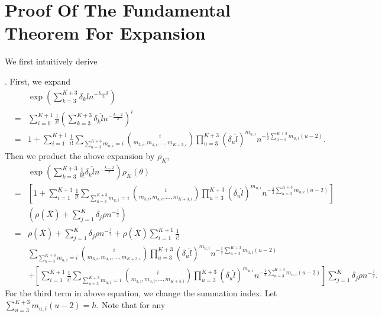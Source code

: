 \section{Proof Of The Fundamental Theorem For Expansion}\label{app-proof-fun-thm}

We first intuitively derive %
\begin{comment}
add expansion polynomial
\end{comment}
. First, we expand 
\begin{eqnarray*}
 &  & \exp\left(\sum_{k=3}^{K+3}\delta_{k}\hat{l}n^{-\frac{k-2}{2}}\right)\\
 & = & \sum_{i=0}^{K+1}\frac{1}{i!}\left(\sum_{k=3}^{K+3}\delta_{k}\hat{l}n^{-\frac{k-2}{2}}\right)^{i}\\
 & = & 1+\sum_{i=1}^{K+1}\frac{1}{i!}\sum_{\sum_{u=3}^{K+3}m_{u,i}=i}\binom{i}{m_{3,i},m_{4,i},\ldots,m_{K+3,i}}\prod_{u=3}^{K+3}\left(\delta_{u}\hat{l}\right)^{m_{u,i}}n^{-\frac{1}{2}\sum_{u=3}^{K+3}m_{u,i}\left(u-2\right)}.
\end{eqnarray*}
Then we product the above expansion by $\rho_{K}$, 
\begin{eqnarray*}
 &  & \exp\left(\sum_{k=3}^{K+3}\frac{1}{k!}\delta_{k}\hat{l}n^{-\frac{k-2}{2}}\right)\rho_{K}\left(\theta\right)\\
 & = & \left[1+\sum_{i=1}^{K+1}\frac{1}{i!}\sum_{\sum_{u=3}^{K+3}m_{u,i}=i}\binom{i}{m_{3,i},m_{4,i},\ldots,m_{K+3,i}}\prod_{u=3}^{K+3}\left(\delta_{u}\hat{l}\right)^{m_{u,i}}n^{-\frac{1}{2}\sum_{u=3}^{K+3}m_{u,i}\left(u-2\right)}\right]\\
 &  & \left(\rho\left(\overline{X}\right)+\sum_{j=1}^{K}\delta_{j}\rho n^{-\frac{j}{2}}\right)\\
 & = & \rho\left(\overline{X}\right)+\sum_{j=1}^{K}\delta_{j}\rho n^{-\frac{j}{2}}+\rho\left(\overline{X}\right)\sum_{i=1}^{K+1}\frac{1}{i!}\\
 &  & \sum_{\sum_{u=3}^{K+3}m_{u,i}=i}\binom{i}{m_{3,i},m_{4,i},\ldots,m_{K+3,i}}\prod_{u=3}^{K+3}\left(\delta_{u}\hat{l}\right)^{m_{u,i}}n^{-\frac{1}{2}\sum_{u=3}^{K+3}m_{u,i}\left(u-2\right)}\\
 &  & +\left[\sum_{i=1}^{K+1}\frac{1}{i!}\sum_{\sum_{u=3}^{K+3}m_{u,i}=i}\binom{i}{m_{3,i},m_{4,i},\ldots,m_{K+3,i}}\prod_{u=3}^{K+3}\left(\delta_{u}\hat{l}\right)^{m_{u,i}}n^{-\frac{1}{2}\sum_{u=3}^{K+3}m_{u,i}\left(u-2\right)}\right]\sum_{j=1}^{K}\delta_{j}\rho n^{-\frac{j}{2}}.
\end{eqnarray*}
For the third term in above equation, we change the summation index.
Let $\sum_{u=3}^{K+3}m_{u,i}\left(u-2\right)=h$. Note that for any
